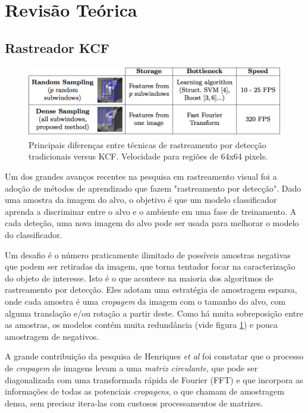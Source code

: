 \documentclass[conference]{IEEEtran}
\begin{document}
\section{Revisão Teórica}

\subsection{Rastreador KCF}
\begin{figure}[ht!]
\begin{center}
\includegraphics[width=\columnwidth]{tabela-henriques.png}
\caption{Principais diferenças entre técnicas de rastreamento por detecção tradicionais versus KCF. Velocidade para regiões de 64x64 pixels\cite{henriques2012}.}\label{kcf-table}
\end{center}
\end{figure}
Um dos grandes avanços recentes na pesquisa em rastreamento visual foi a adoção de métodos de aprendizado que fazem "rastreamento por detecção". Dado uma amostra da imagem do alvo, o objetivo é que um modelo classificador aprenda a discriminar entre o alvo e o ambiente em uma fase de treinamento. A cada deteção, uma nova imagem do alvo pode ser usada para melhorar o modelo do classificador\cite{henriques, henriques2012}.

Um desafio é o número praticamente ilimitado de possíveis amostras negativas que podem ser retiradas da imagem, que torna tentador focar na caracterização do objeto de interesse\cite{henriques}. Isto é o que acontece na maioria dos algoritmos de rastreamento por detecção. Eles adotam uma estratégia de amostragem esparsa, onde cada amostra é uma \textit{cropagem} da imagem com o tamanho do alvo, com alguma translação e/ou rotação a partir deste\cite{henriques2012}. Como há muita sobreposição entre as amostras, os modelos contém muita redundância (vide figura \ref{kcf-table}) e pouca amostragem de negativos.

A grande contribuição da pesquisa de Henriques \textit{et al} foi constatar que o processo de \textit{cropagem} de imagens levam a uma \textit{matriz circulante}, que pode ser diagonalizada com uma transformada rápida de Fourier (FFT) e que incorpora as informações de todas as potenciais \textit{cropagens}, o que chamam de amostragem densa, sem precisar itera-las com custosos processamentos de matrizes\cite{henriques, henriques2012}.
\end{document}
